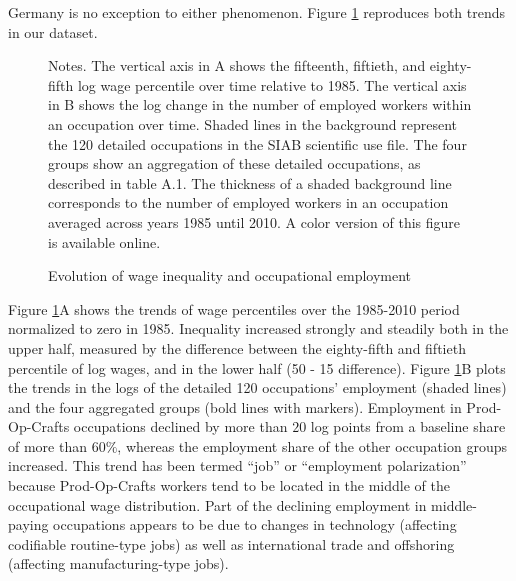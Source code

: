 \documentclass[12pt]{article}
\newcommand{\highlightP}[1]{{\emph{\color{MyPink}{#1}}}}
\theoremstyle{definition}
\begin{document}
\highlightP{Two of the most important trends in developed countries' labor markets over the past decades have been a strong increase in wage inequality and a substantial reallocation of employment across occupations broadly characterized by polarization.} Germany is no exception to either phenomenon. Figure \ref{bohmOccupationGrowthSkill2024_fig1} reproduces both trends in our dataset.

\begin{figure}[H]
    \noindent\caption{Evolution of wage inequality and occupational employment}
    \begin{center}
        \label{bohmOccupationGrowthSkill2024_fig1}
    \end{center}

    {\footnotesize Notes. The vertical axis in A shows the fifteenth, fiftieth, and eighty-fifth log wage percentile over time relative to 1985. The vertical axis in B shows the log change in the number of employed workers within an occupation over time. Shaded lines in the background represent the 120 detailed occupations in the SIAB scientific use file. The four groups show an aggregation of these detailed occupations, as described in table A.1. The thickness of a shaded background line corresponds to the number of employed workers in an occupation averaged across years 1985 until 2010. A color version of this figure is available online.}
\end{figure}

Figure \ref{bohmOccupationGrowthSkill2024_fig1}A shows the trends of wage percentiles over the 1985-2010 period normalized to zero in 1985. Inequality increased strongly and steadily both in the upper half, measured by the difference between the eighty-fifth and fiftieth percentile of log wages, and in the lower half (50 - 15 difference). Figure \ref{bohmOccupationGrowthSkill2024_fig1}B plots the trends in the logs of the detailed 120 occupations' employment (shaded lines) and the four aggregated groups (bold lines with markers). Employment in Prod-Op-Crafts occupations declined by more than $20$ log points from a baseline share of more than $60\%$, whereas the employment share of the other occupation groups increased. This trend has been termed ``job'' or ``employment polarization'' because Prod-Op-Crafts workers tend to be located in the middle of the occupational wage distribution. Part of the declining employment in middle-paying occupations appears to be due to changes in technology (affecting codifiable routine-type jobs) as well as international trade and offshoring (affecting manufacturing-type jobs).
\end{document}
